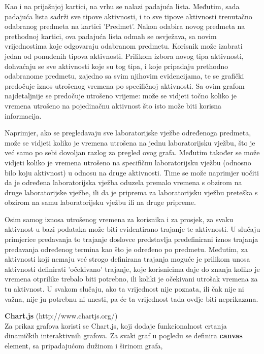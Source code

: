 \documentclass[times, utf8, zavrsni, numeric]{fer}
\begin{document}
Kao i na prijašnjoj kartici, na vrhu se nalazi padajuća lista. Međutim, sada padajuća lista sadrži sve tipove aktivnosti, i to sve tipove aktivnosti trenutačno odabranog predmeta na kartici 'Predmet'. Nakon odabira novog predmeta na prethodnoj kartici, ova padajuća lista odmah se osvježava, sa novim vrijednostima koje odgovaraju odabranom predmetu. Korisnik može izabrati jedan od ponuđenih tipova aktivnosti. Prilikom izbora novog tipa aktivnosti, dohvaćaju se sve aktivnosti koje su tog tipa, i koje pripadaju prethodno odabranome predmetu, zajedno sa svim njihovim evidencijama, te se grafički predočuje iznos utrošenog vremena po specifičnoj aktivnosti. Sa ovim grafom najdetaljnije se predočuje utrošeno vrijeme: može se vidjeti točno koliko je vremena utrošeno na pojedinačnu aktivnost što isto može biti korisna informacija.

Naprimjer, ako se pregledavaju sve laboratorijske vježbe određenoga predmeta, može se vidjeti koliko je vremena utrošena na jednu laboratorijsku vježbu, što je već samo po sebi dovoljan razlog za pregled ovog grafa. Međutim također se može vidjeti koliko je vremena utrošeno na specifičnu laboratorijsku vježbu (odnosno bilo koju aktivnost) u odnosu na druge aktivnosti. Time se može naprimjer uočiti da je određena laboratorijska vježba oduzela premalo vremena s obzirom na druge laboratorijske vježbe, ili da je priprema za laboratorijsku vježbu preteška s obzirom na samu laboratorijsku vježbu ili na druge pripreme.

Osim samog iznosa utrošenog vremena za korisnika i za prosjek, za svaku aktivnost u bazi podataka može biti evidentirano trajanje te aktivnosti. U slučaju primjerice predavanja to trajanje doslovce predstavlja predefinirani iznos trajanja predavanja određenog termina kao što je određeno po predmetu. Međutim, za aktivnosti koji nemaju već strogo definirana trajanja moguće je prilikom unosa aktivnosti definirati 'očekivano' trajanje, koje korisnicima daje do znanja koliko je vremena otprilike trebalo biti potrebno, ili koliki je očekivani utrošak vremena za tu aktivnost. U svakom slučaju, ako ta vrijednost nije poznata, ili čak nije ni važna, nije ju potrebnu ni unesti, pa će ta vrijednost tada ovdje biti neprikazana.

\textbf{Chart.js} (http://www.chartjs.org/)\\
Za prikaz grafova koristi se Chart.js, koji dodaje funkcionalnost crtanja dinamičkih interaktivnih grafova. Za svaki graf u pogledu se definira \textbf{canvas} element, sa pripadajućom dužinom i širinom grafa,
\end{document}
